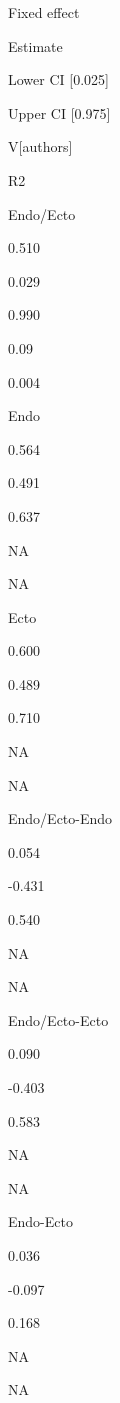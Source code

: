 \documentclass[
]{article}
\begin{document}
Fixed effect

Estimate

Lower CI {[}0.025{]}

Upper CI {[}0.975{]}

V{[}authors{]}

R2

Endo/Ecto

0.510

0.029

0.990

0.09

0.004

Endo

0.564

0.491

0.637

NA

NA

Ecto

0.600

0.489

0.710

NA

NA

Endo/Ecto-Endo

0.054

-0.431

0.540

NA

NA

Endo/Ecto-Ecto

0.090

-0.403

0.583

NA

NA

Endo-Ecto

0.036

-0.097

0.168

NA

NA
\end{document}
